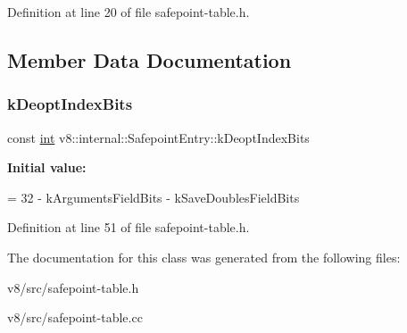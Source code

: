 Definition at line 20 of file safepoint-\/table.\+h.



\subsection{Member Data Documentation}
\mbox{\label{classv8_1_1internal_1_1SafepointEntry_a23565fe7c5f420d94f53724293949f78}} 
\subsubsection{\texorpdfstring{k\+Deopt\+Index\+Bits}{kDeoptIndexBits}}
{\footnotesize\ttfamily const \mbox{\hyperlink{classint}{int}} v8\+::internal\+::\+Safepoint\+Entry\+::k\+Deopt\+Index\+Bits\hspace{0.3cm}{\ttfamily [static]}}

{\bfseries Initial value\+:}
\begin{DoxyCode}
=
      32 - kArgumentsFieldBits - kSaveDoublesFieldBits
\end{DoxyCode}


Definition at line 51 of file safepoint-\/table.\+h.



The documentation for this class was generated from the following files\+:\begin{DoxyCompactItemize}
\item 
v8/src/safepoint-\/table.\+h\item 
v8/src/safepoint-\/table.\+cc\end{DoxyCompactItemize}
